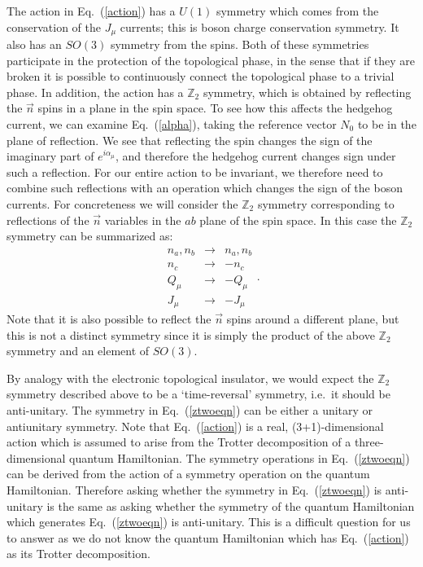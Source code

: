 \documentclass[prb,twocolumn]{revtex4-1}
\def\ztwo{\mathbb{Z}_2}
\begin{document}
The action in Eq.~(\ref{action}) has a $U(1)$ symmetry which comes from the conservation of the $J_\mu$ currents; this is boson charge conservation symmetry. It also has an $SO(3)$ symmetry from the spins. Both of these symmetries participate in the protection of the topological phase, in the sense that if they are broken it is possible to continuously connect the topological phase to a trivial phase.
In addition, the action has a $\ztwo$ symmetry, which is obtained by reflecting the $\vec{n}$ spins in a plane in the spin space. To see how this affects the hedgehog current, we can examine Eq.~(\ref{alpha}), taking the reference vector $N_0$ to be in the plane of reflection. We see that reflecting the spin changes the sign of the imaginary part of $e^{i\alpha_\mu}$, and therefore the hedgehog current changes sign under such a reflection. For our entire action to be invariant, we therefore need to combine such reflections with an operation which changes the sign of the boson currents. For concreteness we will consider the $\ztwo$ symmetry corresponding to reflections of the $\vec{n}$ variables in the $ab$ plane of the spin space. In this case the $\ztwo$ symmetry can be summarized as:
\begin{equation}
\begin{array}{ccc}
n_a,n_b & \rightarrow & n_a,n_b \\
n_c & \rightarrow & -n_c\\
Q_\mu & \rightarrow & -Q_\mu\\
J_\mu & \rightarrow & -J_\mu 
\end{array}.
\label{ztwoeqn}
\end{equation}
Note that it is also possible to reflect the $\vec n$ spins around a different plane, but this is not a distinct symmetry since it is simply the product of the above $\ztwo$ symmetry and an element of $SO(3)$. 

By analogy with the electronic topological insulator, we would expect the $\ztwo$ symmetry described above to be a `time-reversal' symmetry, i.e.~it should be anti-unitary. The symmetry in Eq.~(\ref{ztwoeqn}) can be either a unitary or antiunitary symmetry. Note that Eq.~(\ref{action}) is a real, (3+1)-dimensional action which is assumed to arise from the Trotter decomposition of a three-dimensional quantum Hamiltonian. The symmetry operations in Eq.~(\ref{ztwoeqn}) can be derived from the action of a symmetry operation on the quantum Hamiltonian. Therefore asking whether the symmetry in Eq.~(\ref{ztwoeqn}) is anti-unitary is the same as asking whether the symmetry of the quantum Hamiltonian which generates Eq.~(\ref{ztwoeqn}) is anti-unitary. This is a difficult question for us to answer as we do not know the quantum Hamiltonian which has Eq.~(\ref{action}) as its Trotter decomposition. 
\end{document}
